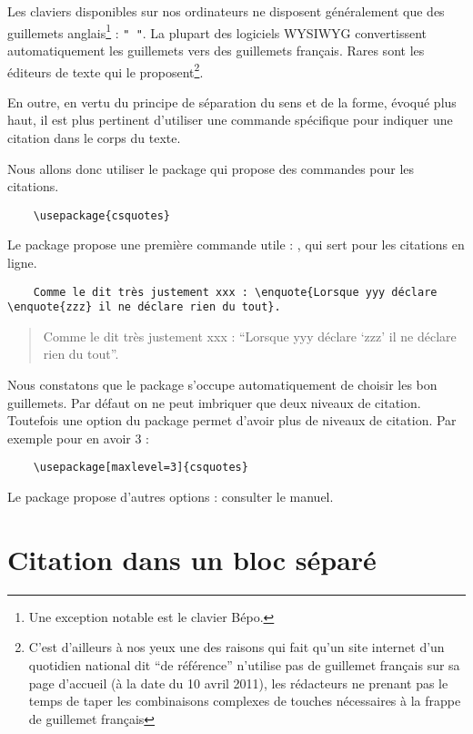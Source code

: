 Les claviers disponibles sur nos ordinateurs ne disposent généralement que des guillemets anglais\footnote{Une exception notable est le clavier Bépo.} : \verb|" "|. 
La plupart des logiciels WYSIWYG convertissent automatiquement les guillemets vers des guillemets français. Rares sont les éditeurs de texte qui le proposent\footnote{C'est d'ailleurs à nos yeux une des raisons qui fait qu'un site internet d'un quotidien national dit \enquote{de référence} n'utilise pas de guillemet français sur sa page d'accueil (à la date du 10 avril 2011), les rédacteurs ne prenant pas le temps de taper les combinaisons complexes de touches nécessaires à la frappe de guillemet français}. 

En outre, en vertu du principe de séparation du sens et de la forme, évoqué plus haut, il est plus pertinent d'utiliser une commande spécifique pour indiquer une citation dans le corps du texte.

Nous allons donc utiliser le package  qui propose des commandes  pour les citations.

\begin{verbatim}
	\usepackage{csquotes}
\end{verbatim}

Le package propose une première commande utile : , qui sert pour les citations en ligne.

\begin{verbatim}
	Comme le dit très justement xxx : \enquote{Lorsque yyy déclare \enquote{zzz} il ne déclare rien du tout}.
\end{verbatim}


\begin{quotation}
	Comme le dit très justement xxx : \enquote{Lorsque yyy déclare \enquote{zzz} il ne déclare rien du tout}.
\end{quotation}


Nous constatons que le package s'occupe automatiquement de choisir les bon guillemets. Par défaut on ne peut imbriquer que deux niveaux de citation. Toutefois une option du package permet d'avoir plus de niveaux de citation. Par exemple pour en avoir 3 : 

\begin{verbatim}
	\usepackage[maxlevel=3]{csquotes}
\end{verbatim}

Le package propose d'autres options : consulter le manuel.

\section{Citation dans un bloc séparé}


